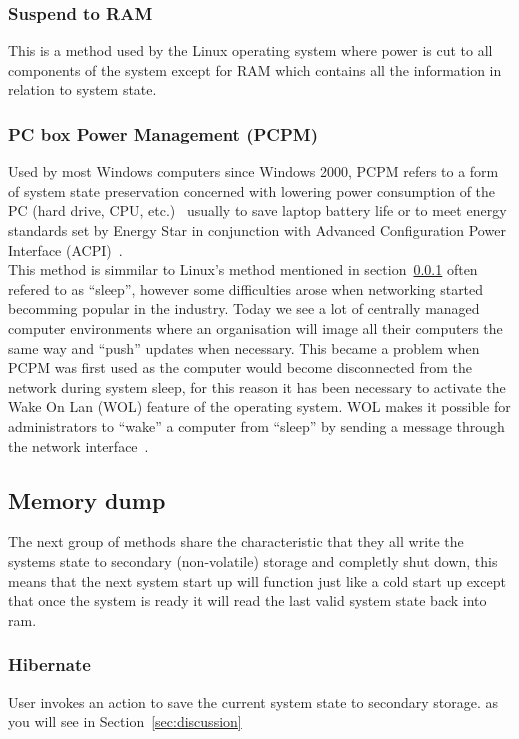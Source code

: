 \documentclass[a4,12pt]{article}
\begin{document}
\subsubsection{Suspend to RAM}\label{sec:stRam}
This is a method used by the Linux operating system where power is cut to all components of the system except for RAM which contains all the information in relation to system state.\citep{Wiki}
\subsubsection{PC box Power Management (PCPM)}
Used by most Windows computers since Windows 2000, PCPM refers to a form of system state preservation concerned with lowering power consumption of the PC (hard drive, CPU, etc.)~\citep{PCPM} usually to save laptop battery life or to meet energy standards set by Energy Star in conjunction with Advanced Configuration Power Interface (ACPI)~\citep{PCPM}.
\\This method is simmilar to Linux's method mentioned in section~\ref{sec:stRam} often refered to as ``sleep'', however some difficulties arose when networking started becomming popular in the industry. Today we see a lot of centrally managed computer environments where an organisation will image all their computers the same way and ``push'' updates when necessary. This became a problem when PCPM was first used as the computer would become disconnected from the network during system sleep, for this reason it has been necessary to activate the Wake On Lan (WOL) feature of the operating system. WOL makes it possible for administrators to ``wake'' a computer from ``sleep'' by sending a message through the network interface~\citep{WOL}. 

\subsection{Memory dump}\label{sec:memorydump}
The next group of methods share the characteristic that they all write the systems state to secondary (non-volatile) storage and completly shut down, this means that the next system start up will function just like a cold start up except that once the system is ready it will read the last valid system state back into ram.
\subsubsection{Hibernate}
User invokes an action to save the current system state to secondary storage.
as you will see in Section~\ref{sec:discussion}
\end{document}
